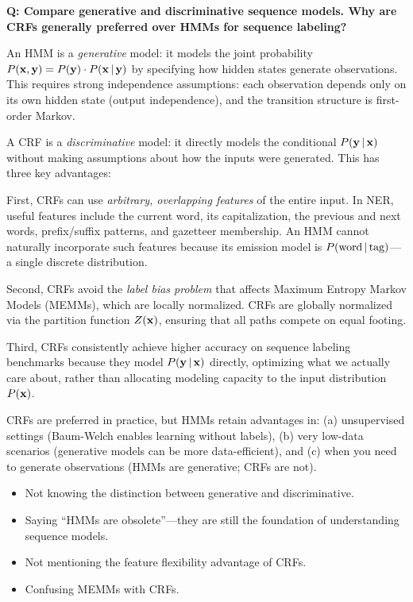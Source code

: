 \begin{interviewq}
\textbf{Q: Compare generative and discriminative sequence models.  Why are
CRFs generally preferred over HMMs for sequence labeling?}

 \quad {} \quad \badgefreq{\freqmed}

\stronganswer
An HMM is a \emph{generative} model: it models the joint probability
$P(\mathbf{x}, \mathbf{y}) = P(\mathbf{y}) \cdot P(\mathbf{x} \,|\, \mathbf{y})$ by specifying how hidden states
generate observations.  This requires strong independence assumptions: each
observation depends only on its own hidden state (output independence), and
the transition structure is first-order Markov.

A CRF is a \emph{discriminative} model: it directly models the conditional
$P(\mathbf{y} \,|\, \mathbf{x})$ without making assumptions about how the inputs were
generated.  This has three key advantages:

First, CRFs can use \emph{arbitrary, overlapping features} of the entire input.
In NER, useful features include the current word, its capitalization, the
previous and next words, prefix/suffix patterns, and gazetteer membership.  An
HMM cannot naturally incorporate such features because its emission model is
$P(\text{word} \,|\, \text{tag})$---a single discrete distribution.

Second, CRFs avoid the \emph{label bias problem} that affects Maximum Entropy
Markov Models (MEMMs), which are locally normalized.  CRFs are globally
normalized via the partition function $Z(\mathbf{x})$, ensuring that all paths
compete on equal footing.

Third, CRFs consistently achieve higher accuracy on sequence labeling
benchmarks because they model $P(\mathbf{y} \,|\, \mathbf{x})$ directly, optimizing what
we actually care about, rather than allocating modeling capacity to the input
distribution $P(\mathbf{x})$.

CRFs are preferred in practice, but HMMs retain advantages in: (a) unsupervised
settings (Baum-Welch enables learning without labels), (b) very low-data
scenarios (generative models can be more data-efficient), and (c) when you
need to generate observations (HMMs are generative; CRFs are not).

\redflags
\begin{itemize}
    \item Not knowing the distinction between generative and discriminative.
    \item Saying ``HMMs are obsolete''---they are still the foundation of
          understanding sequence models.
    \item Not mentioning the feature flexibility advantage of CRFs.
    \item Confusing MEMMs with CRFs.
\end{itemize}


\end{interviewq}
